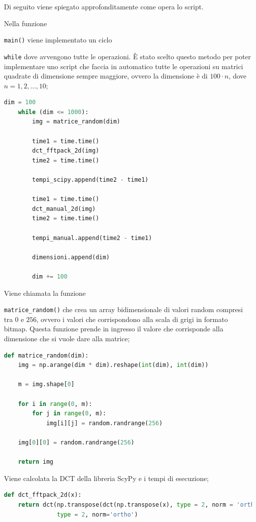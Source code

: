 \documentclass[preprint,12pt]{elsarticle}
\begin{document}
Di seguito viene spiegato approfonditamente come opera lo script.


\begin{enumerate}
\item Nella funzione {\texttt{main()} viene implementato un ciclo {\texttt{while} dove avvengono tutte le operazioni. \`E stato scelto questo metodo per poter implementare uno script che faccia in automatico tutte le operazioni su matrici quadrate di dimensione sempre maggiore, ovvero la dimensione è di $100 \cdot n$, dove $n = 1, 2,  \dots, 10$;
\begin{lstlisting}[language=Python]
dim = 100
    while (dim <= 1000):
        img = matrice_random(dim)
        
        time1 = time.time()
        dct_fftpack_2d(img)
        time2 = time.time()
        
        tempi_scipy.append(time2 - time1)
        
        time1 = time.time()
        dct_manual_2d(img)
        time2 = time.time()
        
        tempi_manual.append(time2 - time1)
        
        dimensioni.append(dim)
        
        dim += 100
\end{lstlisting}

\item Viene chiamata la funzione {\texttt{matrice\_random()} che crea un array bidimensionale di valori random compresi tra $0$ e $256$, ovvero i valori che corrispondono alla scala di grigi in formato bitmap. Questa funzione prende in ingresso il valore che corrisponde alla dimensione che si vuole dare alla matrice;
\begin{lstlisting}[language=Python]
def matrice_random(dim):
    img = np.arange(dim * dim).reshape(int(dim), int(dim))
    
    m = img.shape[0]
    
    for i in range(0, m):
        for j in range(0, m):
            img[i][j] = random.randrange(256)
            
    img[0][0] = random.randrange(256)
            
    return img
\end{lstlisting}

\item Viene calcolata la DCT della libreria ScyPy e i tempi di esecuzione;
\begin{lstlisting}[language=Python]
def dct_fftpack_2d(x):
    return dct(np.transpose(dct(np.transpose(x), type = 2, norm = 'ortho')), \
               type = 2, norm='ortho')
\end{lstlisting}

}}}
\end{enumerate}
\end{document}
